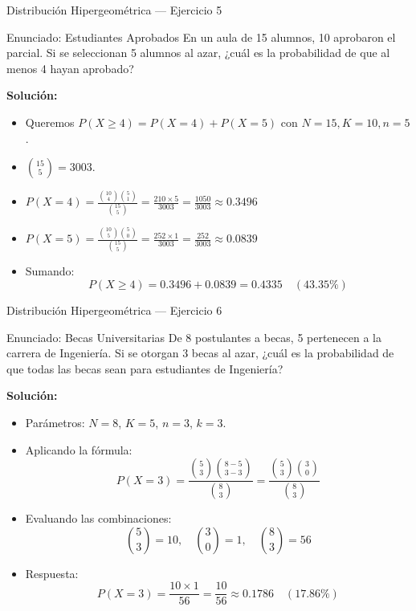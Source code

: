 \documentclass[aspectratio=169, 10pt]{beamer}
\begin{document}
\begin{frame}{Distribución Hipergeométrica — Ejercicio 5}
    \begin{exampleblock}{Enunciado: Estudiantes Aprobados}
        En un aula de 15 alumnos, 10 aprobaron el parcial. Si se seleccionan 5 alumnos al azar, ¿cuál es la probabilidad de que al menos 4 hayan aprobado?
    \end{exampleblock}
        \pause
    \textbf{Solución:}
    \begin{itemize}
        \item Queremos $P(X \ge 4) = P(X=4) + P(X=5)$ con $N=15, K=10, n=5$.
        \item $\binom{15}{5} = 3003$.
        \item $P(X = 4) = \frac{\binom{10}{4} \binom{5}{1}}{\binom{15}{5}} = \frac{210 \times 5}{3003} = \frac{1050}{3003} \approx 0.3496$
        \item $P(X = 5) = \frac{\binom{10}{5} \binom{5}{0}}{\binom{15}{5}} = \frac{252 \times 1}{3003} = \frac{252}{3003} \approx 0.0839$
        \item Sumando:
        $$P(X \ge 4) = 0.3496 + 0.0839 = \mathbf{0.4335} \quad (43.35\%)$$
    \end{itemize}
\end{frame}

\begin{frame}{Distribución Hipergeométrica — Ejercicio 6}
    \begin{exampleblock}{Enunciado: Becas Universitarias}
        De 8 postulantes a becas, 5 pertenecen a la carrera de Ingeniería. Si se otorgan 3 becas al azar, ¿cuál es la probabilidad de que todas las becas sean para estudiantes de Ingeniería?
    \end{exampleblock}
        \pause
    \textbf{Solución:}
    \begin{itemize}
        \item Parámetros: $N = 8$, $K = 5$, $n = 3$, $k = 3$.
        \item Aplicando la fórmula:
        $$P(X = 3) = \frac{\binom{5}{3} \binom{8-5}{3-3}}{\binom{8}{3}} = \frac{\binom{5}{3} \binom{3}{0}}{\binom{8}{3}}$$
        \item Evaluando las combinaciones:
        $$\binom{5}{3} = 10, \quad \binom{3}{0} = 1, \quad \binom{8}{3} = 56$$
        \item Respuesta:
        $$P(X = 3) = \frac{10 \times 1}{56} = \frac{10}{56} \approx \mathbf{0.1786} \quad (17.86\%)$$
    \end{itemize}
\end{frame}
\end{document}
